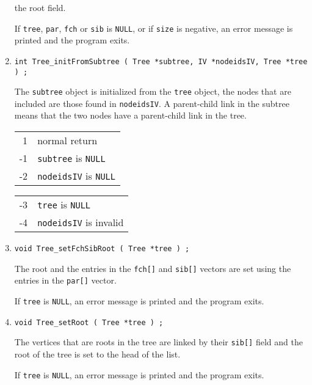 \begin{enumerate}
the root field.
\par {}
If {\tt tree}, {\tt par}, {\tt fch} or {\tt sib} is {\tt NULL},
or if {\tt size} is negative, 
an error message is printed and the program exits.
\item
\begin{verbatim}
int Tree_initFromSubtree ( Tree *subtree, IV *nodeidsIV, Tree *tree ) ;
\end{verbatim}
The {\tt subtree} object is initialized from the {\tt tree} object,
the nodes that are included are those found in {\tt nodeidsIV}.
A parent-child link in the subtree means that the two nodes have a
parent-child link in the tree.
\par {}
\begin{center}
\begin{tabular}{rl}
 1 & normal return \\
-1 & {\tt subtree} is {\tt NULL} \\
-2 & {\tt nodeidsIV} is {\tt NULL} \\
\end{tabular}
\quad
\begin{tabular}{rl}
-3 & {\tt tree} is {\tt NULL} \\
-4 & {\tt nodeidsIV} is invalid
\end{tabular}
\end{center}
\item
\begin{verbatim}
void Tree_setFchSibRoot ( Tree *tree ) ;
\end{verbatim}
The root and the entries in the {\tt fch[]} and {\tt sib[]} 
vectors are set using the entries in the {\tt par[]} vector.
\par {}
If {\tt tree} is {\tt NULL},
an error message is printed and the program exits.
\item
\begin{verbatim}
void Tree_setRoot ( Tree *tree ) ;
\end{verbatim}
The vertices that are roots in the tree are linked by
their {\tt sib[]} field and the root of the tree is set to the head
of the list.
\par {}
If {\tt tree} is {\tt NULL},
an error message is printed and the program exits.
\end{enumerate}
\par
